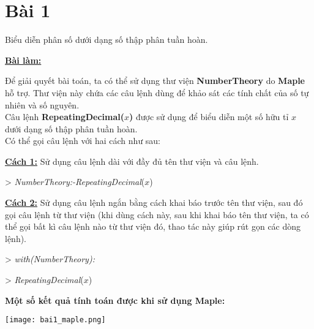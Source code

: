 \section*{Bài 1}

Biểu diễn phân số dưới dạng số thập phân tuần hoàn.
	

\begin{center}
    \textbf{\underline{Bài làm:}}
\end{center}

Để giải quyết bài toán, ta có thể sử dụng thư viện \textbf{NumberTheory} do \textbf{Maple} hỗ trợ. Thư viện này chứa các câu lệnh dùng để khảo sát các tính chất của số tự nhiên và số nguyên.\\
Câu lệnh \textbf{RepeatingDecimal($x$)} được sử dụng để biểu diễn một số hữu tỉ $x$  dưới dạng số thập phân tuần hoàn.\\
Có thể gọi câu lệnh với hai cách như sau:

\underline{\textbf{Cách 1:}} Sử dụng câu lệnh dài với đầy đủ tên thư viện và câu lệnh.

> \emph{NumberTheory:-RepeatingDecimal}($x$)

\underline{\textbf{Cách 2:}} Sử dụng câu lệnh ngắn bằng cách khai báo trước tên thư viện, sau đó gọi câu lệnh từ thư viện (khi dùng cách này, sau khi khai báo tên thư viện, ta có thể gọi bất kì câu lệnh nào từ thư viện đó, thao tác này  giúp rút gọn các dòng lệnh).

> \emph{with(NumberTheory):}

> \emph{RepeatingDecimal}($x$)

\textbf{Một số kết quả tính toán được khi sử dụng Maple:}

\texttt{[image: bai1\_maple.png]}

\clearpage